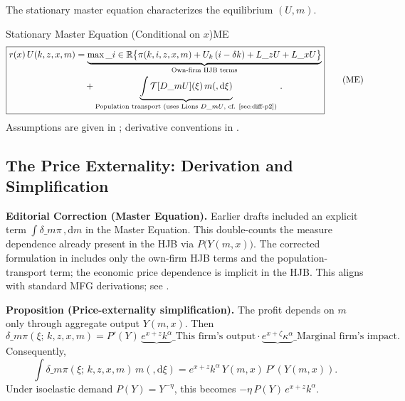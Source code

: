 ﻿\documentclass[11pt,letterpaper,oneside]{article}
\numberwithin{equation}{section}
\newcommand{\R}{\mathbb{R}}
\newcommand{\1}{\mathbf{1}}
\newcommand{\diff}{,\mathrm{d}}
\newcommand{\Lz}{L\_z}
\newcommand{\Lx}{L\_x}
\newcommand{\dmU}{D\_m U}
\newcommand{\Dm}{D\_m}
\begin{document}
The stationary master equation characterizes the equilibrium $(U,m)$.

\begin{theorem}{Stationary Master Equation (Conditional on $x$)}{ME}
\begin{equation}
\boxed{\begin{aligned}
r(x)\,U(k,z,x,m) &= \underbrace{\max\_{i\in\R}\big\{\pi(k,i,z,x,m) + U_k\,(i-\delta k) + \Lz U + \Lx U\big\}}_{\text{Own-firm HJB terms}} \\
&\quad + \underbrace{\int \mathcal{T}[\dmU](\xi)\, m(\diff \xi)}_{\text{Population transport (uses Lions $\Dm U$, cf. \Cref{sec:diff-p2})}}\,.
\end{aligned}}
\tag{ME}\label{eq:ME}
\end{equation}
Assumptions are given in ; derivative conventions in .
\end{theorem}

\subsection{The Price Externality: Derivation and Simplification}\label{sec:me-externality}

\begin{tcolorbox}[mathstyle]
\textbf{Editorial Correction (Master Equation).} Earlier drafts included an explicit term $\int \delta\_m \pi\,\diff m$ in the Master Equation. This double-counts the measure dependence already present in the HJB via $P\big(Y(m,x)\big)$. The corrected formulation in  includes only the own-firm HJB terms and the population-transport term; the economic price dependence is implicit in the HJB. This aligns with standard MFG derivations; see \cite{carmona_delarue_2018_mfg,cardaliaguet_delarue_lasry_lions_2019}.
\end{tcolorbox}

\begin{tcolorbox}[mathstyle]
\textbf{Proposition (Price-externality simplification).}\label{prop:externality}
The profit depends on $m$ only through aggregate output $Y(m,x)$. Then
\[
\delta\_m \pi(\xi;\,k,z,x,m)= P'(Y)\,\underbrace{e^{x+z}k^\alpha}\_{\text{This firm's output}}\cdot \underbrace{e^{x+\zeta}\kappa^\alpha}\_{\text{Marginal firm's impact}}.
\]
Consequently,
\[
\int \delta\_m \pi(\xi;\,k,z,x,m)\, m(\diff \xi)
= e^{x+z}k^\alpha\,Y(m,x)\,P'(Y(m,x)).
\]
Under isoelastic demand $P(Y)=Y^{-\eta}$, this becomes $-\eta\,P(Y)\,e^{x+z}k^\alpha$.
\end{tcolorbox}
\end{document}

